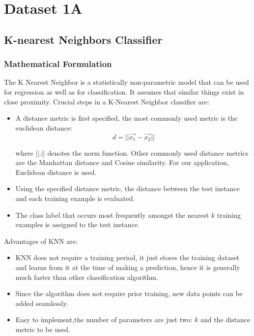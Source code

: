 \documentclass[11pt,a4paper]{article}
\newcommand{\noi}{\noindent}
\begin{document}
{\hypersetup{linkcolor=black}
 \tableofcontents}
\break


\section{Dataset 1A}
\subsection{K-nearest Neighbors Classifier}
\subsubsection{Mathematical Formulation}
\label{sec:1_1}

The K Nearest Neighbor is a statistically non-parametric model that can be used for regression as well as for classification. It assumes that similar things exist in close proximity.  
\noi
Crucial steps in a K-Nearest Neighbor classifier are:
\begin{itemize}
    \itemsep0em
    \item A distance metric is first specified, the most commonly used metric is the euclidean distance:
    \begin{equation}
        d=||\vec{x_1}-\Vec{x_2}||
    \end{equation}
    
    where $||.||$ denotes the norm function. Other commonly used distance metrics are the Manhattan distance and Cosine similarity. For our application, Euclidean distance is used. 
    \item Using the specified distance metric, the distance between the test instance and each training example is evaluated.
    \item The class label that occurs most frequently amongst the nearest $k$ training examples is assigned to the test instance.
\end{itemize}

\noi
Advantages of KNN are:
\begin{itemize}
    \itemsep0em
    \item KNN does not require a training period, it just stores the training dataset and learns from it at the time of making a prediction, hence it is generally much faster than other classification algorithm.
    \item Since the algorithm does not require prior training, new data points can be added seamlessly. 
    \item Easy to implement,the number of parameters are just two: $k$ and the distance metric to be used.
\end{itemize}
\end{document}
